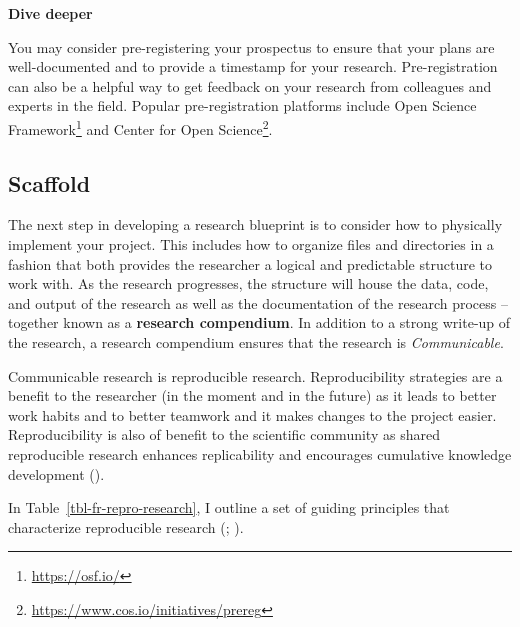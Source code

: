 \documentclass[
  letterpaper,
]{latex/krantz}
\theoremstyle{definition}
\theoremstyle{remark}
\DeclareRobustCommand{\href}[2]{#2\footnote{\url{#1}}}
\begin{document}
\begin{tcolorbox}[enhanced jigsaw, colframe=quarto-callout-color-frame, breakable, bottomrule=.15mm, arc=.35mm, left=2mm, opacityback=0, rightrule=.15mm, colback=white, toprule=.15mm, leftrule=.75mm]

\textbf{ Dive deeper}

You may consider pre-registering your prospectus to ensure that your
plans are well-documented and to provide a timestamp for your research.
Pre-registration can also be a helpful way to get feedback on your
research from colleagues and experts in the field. Popular
pre-registration platforms include \href{https://osf.io/}{Open Science
Framework} and \href{https://www.cos.io/initiatives/prereg}{Center for
Open Science}.

\end{tcolorbox}

\subsection{Scaffold}\label{sec-fr-scaffold}

The next step in developing a research blueprint is to consider how to
physically implement your project. This includes how to organize files
and directories in a fashion that both provides the researcher a logical
and predictable structure to work with. As the research progresses, the
structure will house the data, code, and output of the research as well
as the documentation of the research process --together known as a
\textbf{research compendium}. In addition to a strong write-up of the
research, a research compendium ensures that the research is
\emph{Communicable}.

Communicable research is reproducible research. Reproducibility
strategies are a benefit to the researcher (in the moment and in the
future) as it leads to better work habits and to better teamwork and it
makes changes to the project easier. Reproducibility is also of benefit
to the scientific community as shared reproducible research enhances
replicability and encourages cumulative knowledge development
().

In Table~\ref{tbl-fr-repro-research}, I outline a set of guiding
principles that characterize reproducible research
(;
).
\end{document}
